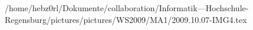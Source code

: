 /home/hebz0rl/Dokumente/collaboration/Informatik---Hochschule-Regensburg/pictures/pictures/WS2009/MA1/2009.10.07-IMG4.tex